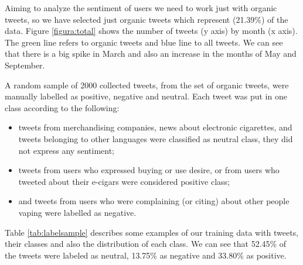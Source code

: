\documentclass{sig-alternate}
\begin{document}
Aiming to analyze the sentiment of users we need to work just with organic tweets, so we have selected just organic tweets which represent (21.39\%) of the data. Figure \ref{figura:total} shows the number of tweets (y axis) by month (x axis). The green line refers to organic tweets and blue line to all tweets. We can see that there is a big spike in March and also an increase in the months of May and September.


A random sample of 2000 collected tweets, from the set of organic tweets, were manually labelled as positive, negative and neutral. Each tweet was put in one class according to the following:
\begin{itemize}
\item  tweets from merchandising companies, news about electronic cigarettes, and tweets belonging to other languages were classified as neutral class, they did not express any sentiment; 
\item  tweets from users who expressed buying or use desire, or from users who tweeted about their e-cigars were considered positive class; 
\item  and tweets from users who were complaining (or citing) about other people vaping were labelled as negative. 
\end{itemize}

Table \ref{tab:labelsample} describes some examples of our training data with tweets, their classes and also the distribution of each class. We can see that 52.45\% of the tweets were labeled as neutral, 13.75\% as negative and 33.80\% as positive. 
\end{document}
